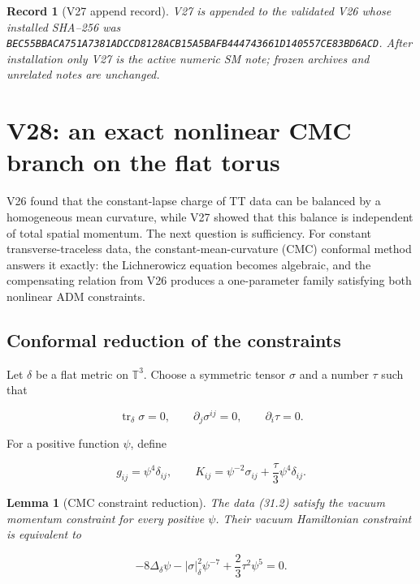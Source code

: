\documentclass[11pt]{article}
\newtheorem{lemma}[theorem]{Lemma}
\newtheorem{record}[theorem]{Record}
\theoremstyle{remark}
\begin{document}
\begin{record}[V27 append record]
\label{rec:v19v27}
V27 is appended to the validated V26 whose installed SHA--256 was
\texttt{BEC55BBACA751A7381ADCCD8128ACB15A5BAFB444743661D140557CE83BD6ACD}.
After installation only V27 is the active numeric SM note; frozen
archives and unrelated notes are unchanged.
\end{record}



\section{V28: an exact nonlinear CMC branch on the flat torus}
\label{sec:v19v28}

V26 found that the constant-lapse charge of TT data can be balanced by a
homogeneous mean curvature, while V27 showed that this balance is
independent of total spatial momentum.  The next question is sufficiency.
For constant transverse-traceless data, the constant-mean-curvature
(CMC) conformal method answers it exactly: the Lichnerowicz equation
becomes algebraic, and the compensating relation from V26 produces a
one-parameter family satisfying both nonlinear ADM constraints.

\subsection{Conformal reduction of the constraints}

Let \(\delta\) be a flat metric on \(\mathbb T^3\).  Choose a symmetric
tensor \(\sigma\) and a number \(\tau\) such that

\[
 \operatorname{tr}_\delta\sigma=0,\qquad
 \partial_j\sigma^{ij}=0,\qquad \partial_i\tau=0.              \tag{31.1}
\]

For a positive function \(\psi\), define

\[
 g_{ij}=\psi^4\delta_{ij},\qquad
 K_{ij}=\psi^{-2}\sigma_{ij}
       +\frac{\tau}{3}\psi^4\delta_{ij}.                       \tag{31.2}
\]

\begin{lemma}[CMC constraint reduction]
\label{lem:v19v28-reduction}
The data (31.2) satisfy the vacuum momentum constraint for every positive
\(\psi\).  Their vacuum Hamiltonian constraint is equivalent to

\[
 -8\Delta_\delta\psi
 -|\sigma|_\delta^2\psi^{-7}
 +\frac23\tau^2\psi^5=0.                                     \tag{31.3}
\]
\end{lemma}
\end{document}
